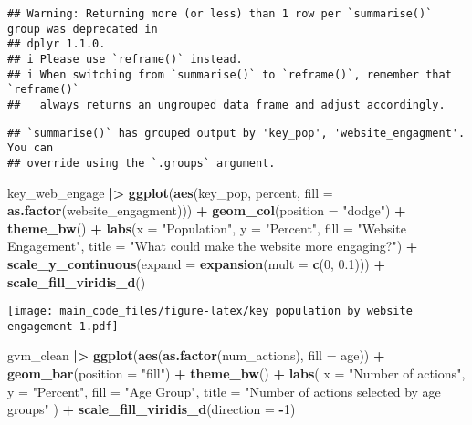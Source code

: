 \documentclass[
]{article}
\newenvironment{Shaded}{\begin{snugshade}}{\end{snugshade}}
\newcommand{\AttributeTok}[1]{\textcolor[rgb]{0.13,0.29,0.53}{#1}}
\newcommand{\DecValTok}[1]{\textcolor[rgb]{0.00,0.00,0.81}{#1}}
\newcommand{\FloatTok}[1]{\textcolor[rgb]{0.00,0.00,0.81}{#1}}
\newcommand{\FunctionTok}[1]{\textcolor[rgb]{0.13,0.29,0.53}{\textbf{#1}}}
\newcommand{\NormalTok}[1]{#1}
\newcommand{\SpecialCharTok}[1]{\textcolor[rgb]{0.81,0.36,0.00}{\textbf{#1}}}
\newcommand{\StringTok}[1]{\textcolor[rgb]{0.31,0.60,0.02}{#1}}
\begin{document}
\begin{verbatim}
## Warning: Returning more (or less) than 1 row per `summarise()` group was deprecated in
## dplyr 1.1.0.
## i Please use `reframe()` instead.
## i When switching from `summarise()` to `reframe()`, remember that `reframe()`
##   always returns an ungrouped data frame and adjust accordingly.
\end{verbatim}

\begin{verbatim}
## `summarise()` has grouped output by 'key_pop', 'website_engagment'. You can
## override using the `.groups` argument.
\end{verbatim}

\begin{Shaded}
\begin{Highlighting}[]
\NormalTok{key\_web\_engage }\SpecialCharTok{|\textgreater{}}
  \FunctionTok{ggplot}\NormalTok{(}\FunctionTok{aes}\NormalTok{(key\_pop, percent, }\AttributeTok{fill =} \FunctionTok{as.factor}\NormalTok{(website\_engagment))) }\SpecialCharTok{+}
  \FunctionTok{geom\_col}\NormalTok{(}\AttributeTok{position =} \StringTok{"dodge"}\NormalTok{) }\SpecialCharTok{+}
  \FunctionTok{theme\_bw}\NormalTok{() }\SpecialCharTok{+}
  \FunctionTok{labs}\NormalTok{(}\AttributeTok{x =} \StringTok{"Population"}\NormalTok{, }\AttributeTok{y =} \StringTok{"Percent"}\NormalTok{, }\AttributeTok{fill =} \StringTok{"Website Engagement"}\NormalTok{, }\AttributeTok{title =} \StringTok{"What could make the website more engaging?"}\NormalTok{) }\SpecialCharTok{+}
  \FunctionTok{scale\_y\_continuous}\NormalTok{(}\AttributeTok{expand =} \FunctionTok{expansion}\NormalTok{(}\AttributeTok{mult =} \FunctionTok{c}\NormalTok{(}\DecValTok{0}\NormalTok{, }\FloatTok{0.1}\NormalTok{))) }\SpecialCharTok{+}
  \FunctionTok{scale\_fill\_viridis\_d}\NormalTok{()}
\end{Highlighting}
\end{Shaded}

\texttt{[image: main\_code\_files/figure-latex/key population by website engagement-1.pdf]}

\begin{Shaded}
\begin{Highlighting}[]
\NormalTok{gvm\_clean }\SpecialCharTok{|\textgreater{}}
  \FunctionTok{ggplot}\NormalTok{(}\FunctionTok{aes}\NormalTok{(}\FunctionTok{as.factor}\NormalTok{(num\_actions), }\AttributeTok{fill =}\NormalTok{ age)) }\SpecialCharTok{+}
  \FunctionTok{geom\_bar}\NormalTok{(}\AttributeTok{position =} \StringTok{"fill"}\NormalTok{) }\SpecialCharTok{+}
  \FunctionTok{theme\_bw}\NormalTok{() }\SpecialCharTok{+}
  \FunctionTok{labs}\NormalTok{(}
    \AttributeTok{x =} \StringTok{"Number of actions"}\NormalTok{,}
    \AttributeTok{y =} \StringTok{"Percent"}\NormalTok{,}
    \AttributeTok{fill =} \StringTok{"Age Group"}\NormalTok{,}
    \AttributeTok{title =} \StringTok{"Number of actions selected by age groups"}
\NormalTok{  ) }\SpecialCharTok{+}
  \FunctionTok{scale\_fill\_viridis\_d}\NormalTok{(}\AttributeTok{direction =} \SpecialCharTok{{-}}\DecValTok{1}\NormalTok{)}
\end{Highlighting}
\end{Shaded}
\end{document}
